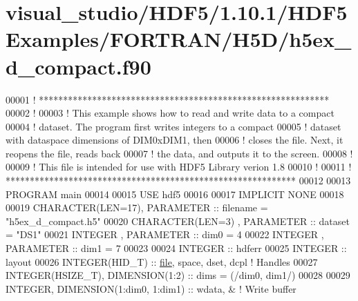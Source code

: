 \hypertarget{visual__studio_2_h_d_f5_21_810_81_2_h_d_f5_examples_2_f_o_r_t_r_a_n_2_h5_d_2h5ex__d__compact_8f90_source}{}\section{visual\+\_\+studio/\+H\+D\+F5/1.10.1/\+H\+D\+F5\+Examples/\+F\+O\+R\+T\+R\+A\+N/\+H5\+D/h5ex\+\_\+d\+\_\+compact.f90}
\label{visual__studio_2_h_d_f5_21_810_81_2_h_d_f5_examples_2_f_o_r_t_r_a_n_2_h5_d_2h5ex__d__compact_8f90_source}

\begin{DoxyCode}
00001 \textcolor{comment}{! ************************************************************}
00002 \textcolor{comment}{!}
00003 \textcolor{comment}{!  This example shows how to read and write data to a compact}
00004 \textcolor{comment}{!  dataset.  The program first writes integers to a compact}
00005 \textcolor{comment}{!  dataset with dataspace dimensions of DIM0xDIM1, then}
00006 \textcolor{comment}{!  closes the file.  Next, it reopens the file, reads back}
00007 \textcolor{comment}{!  the data, and outputs it to the screen.}
00008 \textcolor{comment}{!}
00009 \textcolor{comment}{!  This file is intended for use with HDF5 Library verion 1.8}
00010 \textcolor{comment}{!}
00011 \textcolor{comment}{! ************************************************************}
00012 
00013 \textcolor{keyword}{PROGRAM} main
00014 
00015   \textcolor{keywordtype}{USE }hdf5
00016 
00017   \textcolor{keywordtype}{IMPLICIT NONE}
00018 
00019   \textcolor{keywordtype}{CHARACTER(LEN=17)}, \textcolor{keywordtype}{PARAMETER} :: filename = \textcolor{stringliteral}{"h5ex\_d\_compact.h5"}
00020   \textcolor{keywordtype}{CHARACTER(LEN=3)} , \textcolor{keywordtype}{PARAMETER} :: dataset  = \textcolor{stringliteral}{"DS1"}
00021   \textcolor{keywordtype}{INTEGER}          , \textcolor{keywordtype}{PARAMETER} :: dim0     = 4
00022   \textcolor{keywordtype}{INTEGER}          , \textcolor{keywordtype}{PARAMETER} :: dim1     = 7
00023 
00024   \textcolor{keywordtype}{INTEGER} :: hdferr
00025   \textcolor{keywordtype}{INTEGER} :: layout
00026   \textcolor{keywordtype}{INTEGER(HID\_T)}  :: \hyperlink{structfile}{file}, space, dset, dcpl \textcolor{comment}{! Handles}
00027   \textcolor{keywordtype}{INTEGER(HSIZE\_T)}, \textcolor{keywordtype}{DIMENSION(1:2)} :: dims = (/dim0, dim1/)
00028 
00029   \textcolor{keywordtype}{INTEGER}, \textcolor{keywordtype}{DIMENSION(1:dim0, 1:dim1)} :: wdata, & \textcolor{comment}{! Write buffer}

\end{DoxyCode}

